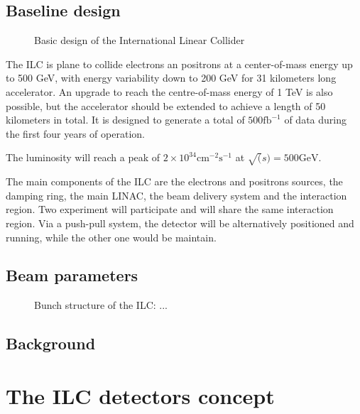     \subsection{Baseline design}

   \begin{figure}
      \centering
      \caption{Basic design of the International Linear Collider}
      \label{fig:ILC}
    \end{figure}


    The ILC is plane to collide electrons an positrons at a center-of-mass energy up to 500 GeV, with energy variability down to 200 GeV for 31 kilometers long accelerator. 
    An upgrade to reach the centre-of-mass energy of 1 TeV is also possible, but the accelerator should be extended to achieve a length of 50 kilometers in total.
    It is designed to generate a total of $500 \text{fb}^{-1}$ of data during the first four years of operation.

    The luminosity will reach a peak of $2 \times 10^{34}\text{cm}^{-2}\text{s}^{-1}$ at $\sqrt(s) = 500 \text{GeV}$.

    The main components of the ILC are the electrons and positrons sources, the damping ring, the main LINAC, the beam delivery system and the interaction region. Two experiment will participate and will share the same interaction region. Via a push-pull system, the detector will be alternatively positioned and running, while the other one would be maintain. 



    \subsection{Beam parameters}

    \begin{figure}
      \centering
      \caption{Bunch structure of the ILC: ...}
      \label{fig:bunches}
    \end{figure}

    \subsection{Background}

  \section{The ILC detectors concept}

